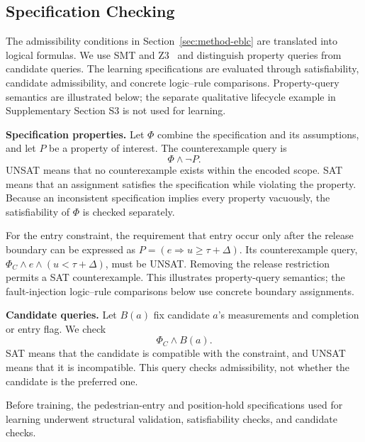 \subsection{Specification Checking}\label{sec:method-checks}

The admissibility conditions in Section~\ref{sec:method-eblc} are translated
into logical formulas. We use SMT and
Z3~\cite{r11,r12} and distinguish property queries from candidate queries.
The learning specifications are evaluated through satisfiability, candidate
admissibility, and concrete logic--rule comparisons. Property-query semantics
are illustrated below; the separate qualitative lifecycle example in
Supplementary Section S3 is not used for learning.

\noindent\textbf{Specification properties.}
Let $\Phi$ combine the specification and its assumptions, and let $P$ be a
property of interest. The counterexample query is
\begin{equation}
\Phi\land\neg P.
\end{equation}
UNSAT means that no counterexample exists within the encoded scope. SAT means
that an assignment satisfies the specification while violating the property.
Because an inconsistent specification implies every property vacuously, the
satisfiability of $\Phi$ is checked separately.

For the entry constraint, the requirement that entry occur only after the
release boundary can be expressed as $P=(e\Rightarrow u\ge\tau+\Delta)$.
Its counterexample query, $\Phi_C\land e\land(u<\tau+\Delta)$, must be UNSAT.
Removing the release restriction permits a SAT counterexample. This illustrates
property-query semantics; the fault-injection logic--rule comparisons below use
concrete boundary assignments.

\noindent\textbf{Candidate queries.}
Let $B(a)$ fix candidate $a$'s measurements and completion or entry flag. We
check
\begin{equation}
\Phi_C\land B(a).
\end{equation}
SAT means that the candidate is compatible with the constraint, and UNSAT means
that it is incompatible. This query checks admissibility, not whether the
candidate is the preferred one.

Before training, the pedestrian-entry and position-hold specifications used for
learning underwent structural validation, satisfiability checks, and candidate
checks.

